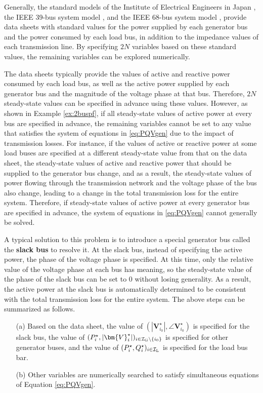 \documentclass[graybox, envcountchap]{svmult}
\begin{document}
Generally, the standard models of the Institute of Electrical Engineers in Japan
\cite{ieejstandardmodel}, the IEEE 39-bus system model
\cite{athay1979practical}, and the IEEE 68-bus system model
\cite{singh2013ieee}, provide data sheets with standard values for the power
supplied by each generator bus and the power consumed by each load bus, in
addition to the impedance values of each transmission line. By specifying $2N$
variables based on these standard values, the remaining variables can be
explored numerically.

The data sheets typically provide the values of active and reactive power
consumed by each load bus, as well as the active power supplied by each
generator bus and the magnitude of the voltage phase at that bus. Therefore,
$2N$ steady-state values can be specified in advance using these values.
However, as shown in Example \ref{ex:2buspf}, if all steady-state values of
active power at every bus are specified in advance, the remaining variables
cannot be set to any value that satisfies the system of equations in
\ref{eq:PQVgen} due to the impact of transmission losses. For instance, if the
values of active or reactive power at some load buses are specified at a
different steady-state value from that on the data sheet, the steady-state
values of active and reactive power that should be supplied to the generator bus
change, and as a result, the steady-state values of power flowing through the
transmission network and the voltage phase of the bus also change, leading to a
change in the total transmission loss for the entire system. Therefore, if
steady-state values of active power at every generator bus are specified in
advance, the system of equations in \ref{eq:PQVgen} cannot generally be solved.

A typical solution to this problem is to introduce a special generator bus
called the \textbf{slack bus}  to resolve it. At the slack bus,
instead of specifying the active power, the phase of the voltage phase is
specified. At this time, only the relative value of the voltage phase at each
bus has meaning, so the steady-state value of the phase of the slack bus can be
set to 0 without losing generality. As a result, the active power at the slack
bus is automatically determined to be consistent with the total transmission
loss for the entire system. The above steps can be summarized as follows.

\medskip
\begin{breakbox}
\begin{itemize}
  \item[(a)] Based on the data sheet, the value of $(|\bm{V}_{i_0}^{\star}|,\angle
  \bm{V}_{i_0}^{\star})$ is specified for the slack bus, the value of
  $(P_i^{\star},|\bm{V}_{i}^{\star}|)_{i \in \mathcal{I}_{\rm G}\setminus\{i_0\}
  }$ is specified for other generator buses, and the value of
  $(P_i^{\star},Q_i^{\star})_{i \in \mathcal{I}_{\rm L}}$ is specified for the
  load bus bar.
  \item[(b)] Other variables are numerically searched to satisfy simultaneous
  equations of Equation \ref{eq:PQVgen}.
\end{itemize}
\end{breakbox}
\medskip
\end{document}
